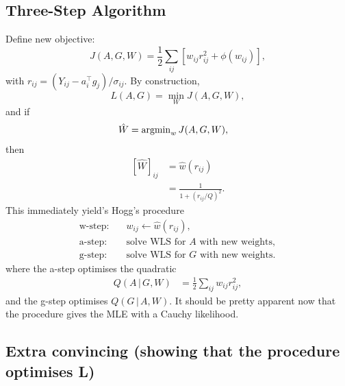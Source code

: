 \documentclass[onecolumn,floatfix]{aastex631}
\begin{document}
\subsection{Three-Step Algorithm}

Define new objective:
\begin{equation}
    J(A,G,W) = \frac{1}{2}\sum_{ij} \left[ w_{ij} r_{ij}^2 + \phi(w_{ij}) \right],
\end{equation}
with $r_{ij} = (Y_{ij} - a_i^\top g_j)/\sigma_{ij}$.
By construction,
\begin{equation}
    L(A,G) = \min_W J(A,G,W),
\end{equation}
and if
\begin{align}
    \hat{W} &= {\rm argmin}_w \, J(A, G, W),
\end{align}
then
\begin{align}
    \left[ \hat{W} \right]_{ij} &= \hat{w} (r_{ij}) \\
    &= \frac{1}{1 + (r_{ij} / Q)^2}.
\end{align}
This immediately yield's Hogg's procedure
\begin{align*}
    \text{w-step:} \quad & w_{ij} \leftarrow \hat{w}(r_{ij}), \\
    \text{a-step:} \quad & \text{solve WLS for $A$ with new weights}, \\
    \text{g-step:} \quad & \text{solve WLS for $G$ with new weights}.
\end{align*}
where the a-step optimises the quadratic
\begin{align}
    Q(A \, | \, G, W) &= \frac{1}{2} \sum_{ij} w_{ij} r_{ij}^2,
\end{align}
and the g-step optimises $Q(G \, | \, A, W)$.
It should be pretty apparent now that the procedure gives the MLE with a Cauchy likelihood.

\subsection{Extra convincing (showing that the procedure optimises L)}
\end{document}
